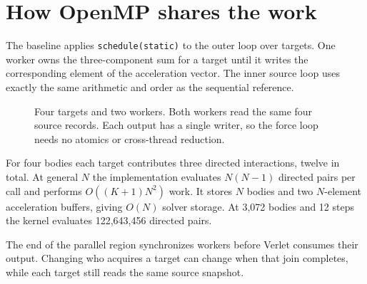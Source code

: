 \documentclass[11pt,a4paper]{article}
\newcommand{\topic}[1]{\clearpage\section*{#1}}
\begin{document}
\topic{How OpenMP shares the work}
The baseline applies \texttt{schedule(static)} to the outer loop over targets.
One worker owns the three-component sum for a target until it writes the
corresponding element of the acceleration vector. The inner source loop
uses exactly the same arithmetic and order as the sequential reference.
\begin{figure}[H]\centering
{}
\caption{Four targets and two workers. Both workers read the same four source
records. Each output has a single writer, so the force loop needs no atomics
or cross-thread reduction.}
\end{figure}
For four bodies each target contributes three directed interactions, twelve
in total. At general $N$ the implementation evaluates $N(N-1)$ directed
pairs per call and performs $O((K+1)N^2)$ work. It stores $N$ bodies and
two $N$-element acceleration buffers, giving $O(N)$ solver storage.
At 3,072 bodies and 12 steps the kernel evaluates 122,643,456 directed pairs.

The end of the parallel region synchronizes workers before Verlet consumes
their output. Changing who acquires a target can change when that join
completes, while each target still reads the same source snapshot.
\end{document}
